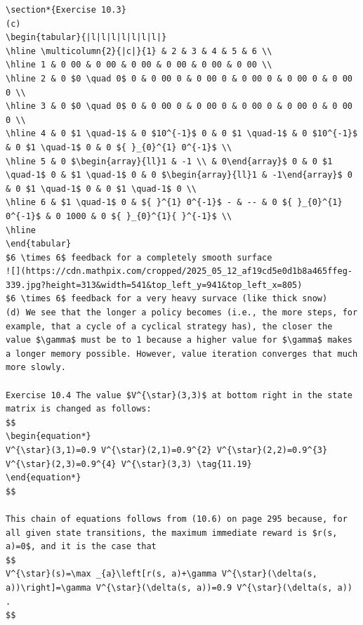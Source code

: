 \documentclass[10pt]{book}
\begin{document}
\begin{center}
\begin{enumerate}
\begin{center}
\begin{center}
\begin{center}
\begin{center}
\begin{center}
\begin{verbatim}
\section*{Exercise 10.3}
(c)
\begin{tabular}{|l|l|l|l|l|l|l|}
\hline \multicolumn{2}{|c|}{1} & 2 & 3 & 4 & 5 & 6 \\
\hline 1 & 0 00 & 0 00 & 0 00 & 0 00 & 0 00 & 0 00 \\
\hline 2 & 0 $0 \quad 0$ 0 & 0 00 0 & 0 00 0 & 0 00 0 & 0 00 0 & 0 00 0 \\
\hline 3 & 0 $0 \quad 0$ 0 & 0 00 0 & 0 00 0 & 0 00 0 & 0 00 0 & 0 00 0 \\
\hline 4 & 0 $1 \quad-1$ & 0 $10^{-1}$ 0 & 0 $1 \quad-1$ & 0 $10^{-1}$ & 0 $1 \quad-1$ 0 & 0 ${ }_{0}^{1} 0^{-1}$ \\
\hline 5 & 0 $\begin{array}{ll}1 & -1 \\ & 0\end{array}$ 0 & 0 $1 \quad-1$ 0 & $1 \quad-1$ 0 & 0 $\begin{array}{ll}1 & -1\end{array}$ 0 & 0 $1 \quad-1$ 0 & 0 $1 \quad-1$ 0 \\
\hline 6 & $1 \quad-1$ 0 & ${ }^{1} 0^{-1}$ - & -- & 0 ${ }_{0}^{1} 0^{-1}$ & 0 1000 & 0 ${ }_{0}^{1}{ }^{-1}$ \\
\hline
\end{tabular}
$6 \times 6$ feedback for a completely smooth surface
![](https://cdn.mathpix.com/cropped/2025_05_12_af19cd5e0d1b8a465ffeg-339.jpg?height=313&width=541&top_left_y=941&top_left_x=805)
$6 \times 6$ feedback for a very heavy survace (like thick snow)
(d) We see that the longer a policy becomes (i.e., the more steps, for example, that a cycle of a cyclical strategy has), the closer the value $\gamma$ must be to 1 because a higher value for $\gamma$ makes a longer memory possible. However, value iteration converges that much more slowly.

Exercise 10.4 The value $V^{\star}(3,3)$ at bottom right in the state matrix is changed as follows:
$$
\begin{equation*}
V^{\star}(3,1)=0.9 V^{\star}(2,1)=0.9^{2} V^{\star}(2,2)=0.9^{3} V^{\star}(2,3)=0.9^{4} V^{\star}(3,3) \tag{11.19}
\end{equation*}
$$

This chain of equations follows from (10.6) on page 295 because, for all given state transitions, the maximum immediate reward is $r(s, a)=0$, and it is the case that
$$
V^{\star}(s)=\max _{a}\left[r(s, a)+\gamma V^{\star}(\delta(s, a))\right]=\gamma V^{\star}(\delta(s, a))=0.9 V^{\star}(\delta(s, a)) .
$$


\end{verbatim}
\end{center}
\end{center}
\end{center}
\end{center}
\end{center}
\end{enumerate}
\end{center}
\end{document}
